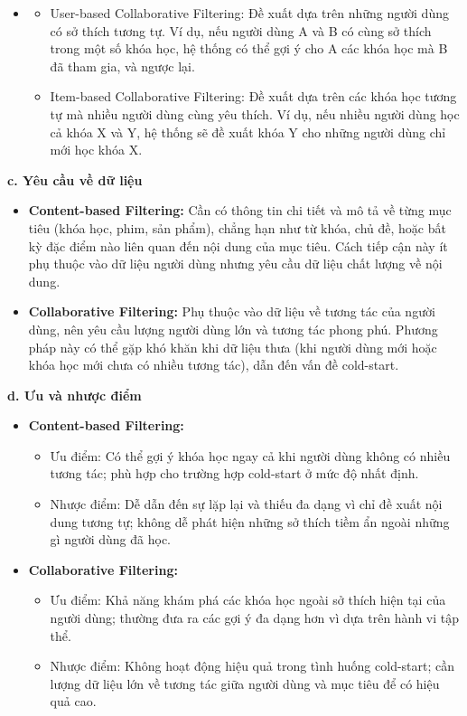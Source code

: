\begin{itemize}
    \item
    \begin{itemize}
        \item User-based Collaborative Filtering: Đề xuất dựa trên những người dùng có sở thích tương tự. Ví dụ, nếu người dùng A và B có cùng sở thích trong một số khóa học, hệ thống có thể gợi ý cho A các khóa học mà B đã tham gia, và ngược lại.
        \item Item-based Collaborative Filtering: Đề xuất dựa trên các khóa học tương tự mà nhiều người dùng cùng yêu thích. Ví dụ, nếu nhiều người dùng học cả khóa X và Y, hệ thống sẽ đề xuất khóa Y cho những người dùng chỉ mới học khóa X.
    \end{itemize}
\end{itemize}
\textbf{c. Yêu cầu về dữ liệu}
\begin{itemize}
    \item \textbf{Content-based Filtering:} Cần có thông tin chi tiết và mô tả về từng mục tiêu (khóa học, phim, sản phẩm), chẳng hạn như từ khóa, chủ đề, hoặc bất kỳ đặc điểm nào liên quan đến nội dung của mục tiêu. Cách tiếp cận này ít phụ thuộc vào dữ liệu người dùng nhưng yêu cầu dữ liệu chất lượng về nội dung.
    \item \textbf{Collaborative Filtering:} Phụ thuộc vào dữ liệu về tương tác của người dùng, nên yêu cầu lượng người dùng lớn và tương tác phong phú. Phương pháp này có thể gặp khó khăn khi dữ liệu thưa (khi người dùng mới hoặc khóa học mới chưa có nhiều tương tác), dẫn đến vấn đề cold-start.
\end{itemize}
\textbf{d. Ưu và nhược điểm}
\begin{itemize}
    \item \textbf{Content-based Filtering:}
    \begin{itemize}
        \item Ưu điểm: Có thể gợi ý khóa học ngay cả khi người dùng không có nhiều tương tác; phù hợp cho trường hợp cold-start ở mức độ nhất định.
        \item Nhược điểm: Dễ dẫn đến sự lặp lại và thiếu đa dạng vì chỉ đề xuất nội dung tương tự; không dễ phát hiện những sở thích tiềm ẩn ngoài những gì người dùng đã học.
    \end{itemize}
    \item \textbf{Collaborative Filtering:}
    \begin{itemize}
        \item Ưu điểm: Khả năng khám phá các khóa học ngoài sở thích hiện tại của người dùng; thường đưa ra các gợi ý đa dạng hơn vì dựa trên hành vi tập thể.
        \item Nhược điểm: Không hoạt động hiệu quả trong tình huống cold-start; cần lượng dữ liệu lớn về tương tác giữa người dùng và mục tiêu để có hiệu quả cao.
    \end{itemize}
\end{itemize}

